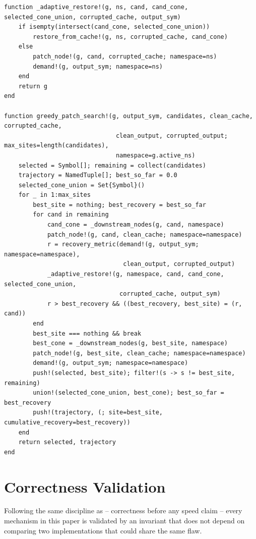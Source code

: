 \documentclass{article}
\begin{document}
\begin{lstlisting}[caption={\texttt{\_adaptive\_restore!} and \texttt{greedy\_patch\_search!} (\texttt{src/patching.jl})},label={lst:greedy}]
function _adaptive_restore!(g, ns, cand, cand_cone, selected_cone_union, corrupted_cache, output_sym)
    if isempty(intersect(cand_cone, selected_cone_union))
        restore_from_cache!(g, ns, corrupted_cache, cand_cone)
    else
        patch_node!(g, cand, corrupted_cache; namespace=ns)
        demand!(g, output_sym; namespace=ns)
    end
    return g
end

function greedy_patch_search!(g, output_sym, candidates, clean_cache, corrupted_cache,
                               clean_output, corrupted_output; max_sites=length(candidates),
                               namespace=g.active_ns)
    selected = Symbol[]; remaining = collect(candidates)
    trajectory = NamedTuple[]; best_so_far = 0.0
    selected_cone_union = Set{Symbol}()
    for _ in 1:max_sites
        best_site = nothing; best_recovery = best_so_far
        for cand in remaining
            cand_cone = _downstream_nodes(g, cand, namespace)
            patch_node!(g, cand, clean_cache; namespace=namespace)
            r = recovery_metric(demand!(g, output_sym; namespace=namespace),
                                 clean_output, corrupted_output)
            _adaptive_restore!(g, namespace, cand, cand_cone, selected_cone_union,
                                corrupted_cache, output_sym)
            r > best_recovery && ((best_recovery, best_site) = (r, cand))
        end
        best_site === nothing && break
        best_cone = _downstream_nodes(g, best_site, namespace)
        patch_node!(g, best_site, clean_cache; namespace=namespace)
        demand!(g, output_sym; namespace=namespace)
        push!(selected, best_site); filter!(s -> s != best_site, remaining)
        union!(selected_cone_union, best_cone); best_so_far = best_recovery
        push!(trajectory, (; site=best_site, cumulative_recovery=best_recovery))
    end
    return selected, trajectory
end
\end{lstlisting}

\section{Correctness Validation}
\label{sec:correctness}

Following the same discipline as \cite{neurodsl} -- correctness before any speed claim -- every
mechanism in this paper is validated by an invariant that does not depend on comparing two
implementations that could share the same flaw.
\end{document}
